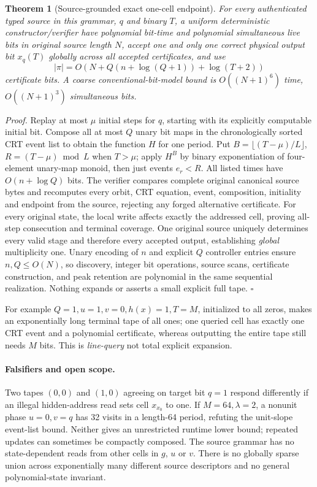 \documentclass[11pt]{article}
\newtheorem{theorem}{Theorem}
\begin{document}
\begin{theorem}[Source-grounded exact one-cell endpoint]
For every authenticated typed source in this grammar, $q$ and binary $T$, a uniform deterministic constructor/verifier have polynomial bit-time and polynomial simultaneous live bits in original source length $N$, accept one and only one correct physical output bit $x_q(T)$ globally across all accepted certificates, and use
\[
 |\pi|=O(N+Q(n+\log(Q+1))+\log(T+2))
\]
certificate bits. A coarse conventional-bit-model bound is $O((N+1)^6)$ time, $O((N+1)^3)$ simultaneous bits.
\end{theorem}
\noindent\emph{Proof.} Replay at most $\mu$ initial steps for $q$, starting with its explicitly computable initial bit. Compose all at most $Q$ unary bit maps in the chronologically sorted CRT event list to obtain the function $H$ for one period. Put $B=\lfloor(T-\mu)/L\rfloor$, $R=(T-\mu)\bmod L$ when $T>\mu$; apply $H^B$ by binary exponentiation of four-element unary-map monoid, then just events $e_r<R$. All listed times have $O(n+\log Q)$ bits. The verifier compares complete original canonical source bytes and recomputes every orbit, CRT equation, event, composition, initiality and endpoint from the source, rejecting any forged alternative certificate. For every original state, the local write affects exactly the addressed cell, proving all-step consecution and terminal coverage. One original source uniquely determines every valid stage and therefore every accepted output, establishing \emph{global} multiplicity one. Unary encoding of $n$ and explicit $Q$ controller entries ensure $n,Q\le O(N)$, so discovery, integer bit operations, source scans, certificate construction, and peak retention are polynomial in the same sequential realization. Nothing expands or asserts a small explicit full tape. \hfill$\square$

For example $Q=1,u=1,v=0,h(x)=1,T=M$, initialized to all zeros, makes an exponentially long terminal tape of all ones; one queried cell has exactly one CRT event and a polynomial certificate, whereas outputting the entire tape still needs $M$ bits. This is \emph{line-query} not total explicit expansion.

\paragraph{Falsifiers and open scope.} Two tapes $(0,0)$ and $(1,0)$ agreeing on target bit $q=1$ respond differently if an illegal hidden-address read sets cell $x_{x_0}$ to one. If $M=64,\lambda=2$, a nonunit phase $u=0,v=q$ has 32 visits in a length-64 period, refuting the unit-slope event-list bound. Neither gives an unrestricted runtime lower bound; repeated updates can sometimes be compactly composed. The source grammar has no state-dependent reads from other cells in $g$, $u$ or $v$. There is no globally sparse union across exponentially many different source descriptors and no general polynomial-state invariant.
\end{document}
